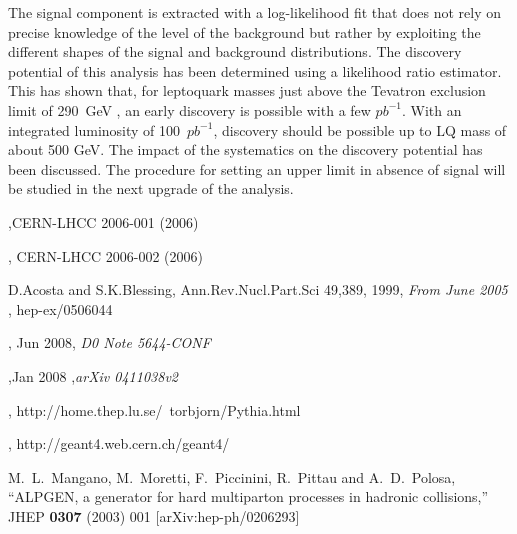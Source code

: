 \documentclass{cmspaper}
\begin{document}
\begin{linenumbers}
The signal component is extracted with a log-likelihood fit that does not rely on precise knowledge
of the level of the background but rather by exploiting the different shapes of the signal and background
distributions. 
The discovery potential of this analysis has been determined using a likelihood 
ratio estimator. This has shown that, for leptoquark masses just above the Tevatron exclusion limit of 290~GeV
\cite{d02008}, an early discovery is possible with a few $pb^{-1}$.
With an integrated luminosity of 100~$pb^{-1}$, discovery should be possible up
to LQ mass of about 500 GeV.
The impact of the systematics on the discovery potential has been discussed.
The procedure for setting an upper limit in absence of signal will be studied 
in the next upgrade of the analysis.



\begin{thebibliography}{}

,CERN-LHCC 2006-001 (2006)
  
, CERN-LHCC 2006-002 (2006)
  
 {D.Acosta and S.K.Blessing, Ann.Rev.Nucl.Part.Sci 49,389},
  1999,
  {\em From June 2005}
, hep-ex/0506044
  
, Jun 2008,
  {\em D0 Note 5644-CONF}  %
  
,Jan 2008 ,{\em arXiv 0411038v2}

, http://home.thep.lu.se/~torbjorn/Pythia.html

, http://geant4.web.cern.ch/geant4/

  M.~L.~Mangano, M.~Moretti, F.~Piccinini, R.~Pittau and A.~D.~Polosa,
  ``ALPGEN, a generator for hard multiparton processes in hadronic collisions,''
  JHEP {\bf 0307} (2003) 001
  [arXiv:hep-ph/0206293]
  


\end{thebibliography}
\end{linenumbers}
\end{document}
